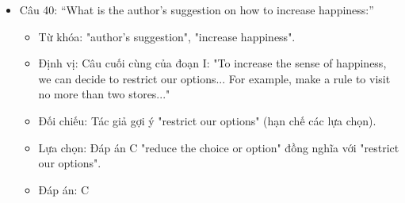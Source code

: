 \documentclass{../templateReading/cdreading}
\begin{document}
\begin{itemize}
\begin{itemize}
\item Lựa chọn: Đáp án D "people will feel regret more when they fail to use a higher-priced purchase" khớp hoàn toàn với ý này.
\item Đáp án: D
\end{itemize}
\item Câu 40: “What is the author’s suggestion on how to increase happiness:”
\begin{itemize}
\item Từ khóa: "author’s suggestion", "increase happiness".
\item Định vị: Câu cuối cùng của đoạn I: "To increase the sense of happiness, we can decide to restrict our options... For example, make a rule to visit no more than two stores..."
\item Đối chiếu: Tác giả gợi ý "restrict our options" (hạn chế các lựa chọn).
\item Lựa chọn: Đáp án C "reduce the choice or option" đồng nghĩa với "restrict our options".
\item Đáp án: C
\end{itemize}
\end{itemize}
\end{document}
